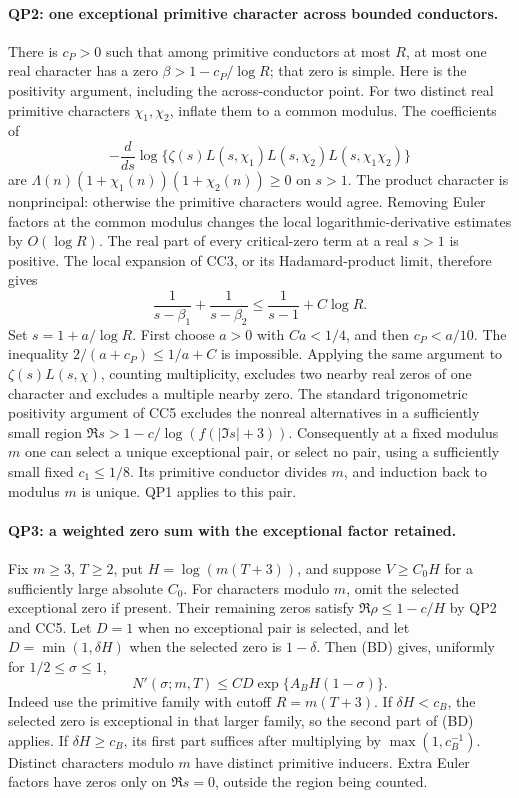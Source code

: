 \paragraph{QP2: one exceptional primitive character across bounded conductors.}
There is $c_P>0$ such that among primitive conductors at most $R$, at most
one real character has a zero $\beta>1-c_P/\log R$; that zero is simple.
Here is the positivity argument, including the across-conductor point.
For two distinct real primitive characters $\chi_1,\chi_2$, inflate them
to a common modulus.  The coefficients of
\[
 -\frac d{ds}\log\{\zeta(s)L(s,\chi_1)L(s,\chi_2)
                                      L(s,\chi_1\chi_2)\}
\]
are $\Lambda(n)(1+\chi_1(n))(1+\chi_2(n))\ge0$ on $s>1$.
The product character is nonprincipal: otherwise the primitive characters
would agree.  Removing Euler factors at the common modulus changes the
local logarithmic-derivative estimates by $O(\log R)$.
The real part of every critical-zero term at a real $s>1$ is positive.
The local expansion of CC3, or its Hadamard-product limit, therefore gives
\[
 \frac1{s-\beta_1}+\frac1{s-\beta_2}
                  \le\frac1{s-1}+C\log R.             \tag{QP.2}
\]
Set $s=1+a/\log R$.  First choose $a>0$ with $Ca<1/4$, and then
$c_P<a/10$.  The inequality
$2/(a+c_P)\le1/a+C$ is impossible.  Applying the same argument to
$\zeta(s)L(s,\chi)$, counting multiplicity, excludes two nearby real
zeros of one character and excludes a multiple nearby zero.
The standard trigonometric positivity argument of CC5 excludes the
nonreal alternatives in a sufficiently small region
$\Re s>1-c/\log(f(|\Im s|+3))$.
Consequently at a fixed modulus $m$ one can select a unique exceptional
pair, or select no pair, using a sufficiently small fixed $c_1\le1/8$.
Its primitive conductor divides $m$, and induction back to modulus $m$
is unique.  QP1 applies to this pair.

\paragraph{QP3: a weighted zero sum with the exceptional factor retained.}
Fix $m\ge3$, $T\ge2$, put $H=\log(m(T+3))$, and suppose
$V\ge C_0H$ for a sufficiently large absolute $C_0$.
For characters modulo $m$, omit the selected exceptional zero if present.
Their remaining zeros satisfy $\Re\rho\le1-c/H$ by QP2 and CC5.
Let $D=1$ when no exceptional pair is selected, and let
$D=\min(1,\delta H)$ when the selected zero is $1-\delta$.
Then (BD) gives, uniformly for $1/2\le\sigma\le1$,
\[
 N'(\sigma;m,T)\le C D\exp\{A_BH(1-\sigma)\}.          \tag{QP.3}
\]
Indeed use the primitive family with cutoff $R=m(T+3)$.  If
$\delta H<c_B$, the selected zero is exceptional in that larger family,
so the second part of (BD) applies.  If $\delta H\ge c_B$, its first part
suffices after multiplying by $\max(1,c_B^{-1})$.  Distinct characters
modulo $m$ have distinct primitive inducers.  Extra Euler factors have
zeros only on $\Re s=0$, outside the region being counted.

